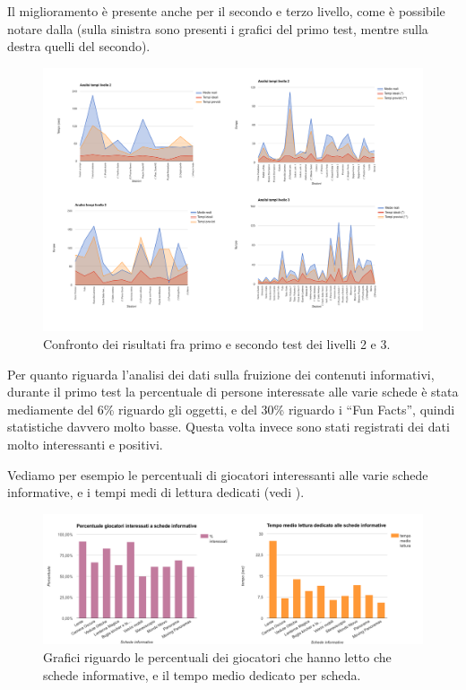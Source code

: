 Il miglioramento è presente anche per il secondo e terzo livello, come è possibile notare dalla \myfig{\ref{fig:test-confronto-tempi2-3}} (sulla sinistra sono presenti i grafici del primo test, mentre sulla destra quelli del secondo).

\begin{figure}[h]
\centerline{\includegraphics[scale=0.3]{images/risultati/test-confronto-tempi2-3.png}}
\caption{Confronto dei risultati fra primo e secondo test dei livelli 2 e 3.}
\label{fig:test-confronto-tempi2-3}
\end{figure}

Per quanto riguarda l'analisi dei dati sulla fruizione dei contenuti informativi, durante il primo test la percentuale di persone interessate alle varie schede è stata mediamente del 6\% riguardo gli oggetti, e del 30\% riguardo i ``Fun Facts'', quindi statistiche davvero molto basse. Questa volta invece sono stati registrati dei dati molto interessanti e positivi.

Vediamo per esempio le percentuali di giocatori interessanti alle varie schede informative, e i tempi medi di lettura dedicati (vedi \myfig{\ref{fig:test-percTempiSchede}}).

\begin{figure}[h]
\centerline{\includegraphics[scale=0.35]{images/risultati/test_seriousStats.png}}
\caption{Grafici riguardo le percentuali dei giocatori che hanno letto che schede informative, e il tempo medio dedicato per scheda.}
\label{fig:test-percTempiSchede}
\end{figure}

